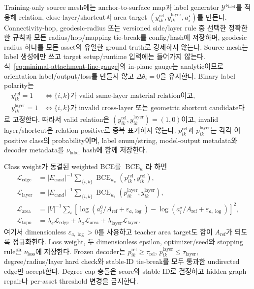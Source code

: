 \documentclass[11pt]{article}
\begin{document}
Training-only source mesh에는 anchor-to-surface map과 label generator
\(\mathcal Y^{\nu_{\mathrm{label}}}\)를 적용해 relation, close-layer/shortcut과 area target
\((y_{ik}^{\mathrm{rel}},y_{ik}^{\mathrm{layer}},a_i^\star)\)를 만든다. Connectivity-hop, geodesic-radius
또는 versioned side/layer rule 중 선택한 정확한 한 규칙과 모든 radius/hop/mapping tie-break를 config/hash에
저장하며, geodesic radius 하나를 모든 asset의 유일한 ground truth로 강제하지 않는다. Source mesh는
label 생성에만 쓰고 target setup/runtime 입력에는 들어가지 않는다. 식~\eqref{eq:minimal-attachment-line-gauge}의
in-plane gauge는 analytic이므로 orientation label/output/loss를 만들지 않고 \(\Delta\theta_i=0\)을 유지한다.
Binary label polarity는
\[
\begin{aligned}
  y_{ik}^{\mathrm{rel}}=1
  &\iff \{i,k\}\text{가 valid same-layer material relation이고},\\
  y_{ik}^{\mathrm{layer}}=1
  &\iff \{i,k\}\text{가 invalid cross-layer 또는 geometric shortcut candidate다}
\end{aligned}
\]
로 고정한다. 따라서 valid relation은 \((y_{ik}^{\mathrm{rel}},y_{ik}^{\mathrm{layer}})=(1,0)\)이고,
invalid layer/shortcut은 relation positive로 중복 표기하지 않는다.
\(p_{ik}^{\mathrm{rel}}\)과 \(p_{ik}^{\mathrm{layer}}\)는 각각 이 positive class의 probability이며,
label enum/string, model-output metadata와 decoder metadata를 \(\nu_{\mathrm{label}}\) hash에 함께 저장한다.

Class weight가 동결된 weighted BCE를 \(\operatorname{BCE}_{w}\)라 하면
\begin{equation}
\begin{aligned}
  \mathcal L_{\mathrm{edge}}
  &=|E_{\mathrm{cand}}|^{-1}\sum_{\{i,k\}}\operatorname{BCE}_{w_e}
    (p_{ik}^{\mathrm{rel}},y_{ik}^{\mathrm{rel}}),\\
  \mathcal L_{\mathrm{layer}}
  &=|E_{\mathrm{cand}}|^{-1}\sum_{\{i,k\}}\operatorname{BCE}_{w_l}
    (p_{ik}^{\mathrm{layer}},y_{ik}^{\mathrm{layer}}),\\
  \mathcal L_{\mathrm{area}}
  &=|V|^{-1}\sum_i\left[\log(a_i^0/A_{\mathrm{ref}}+\varepsilon_{a,\log})-
    \log(a_i^\star/A_{\mathrm{ref}}+\varepsilon_{a,\log})\right]^2,\\
  \mathcal L_{\mathrm{topo}}
  &=\lambda_e\mathcal L_{\mathrm{edge}}
    +\lambda_a\mathcal L_{\mathrm{area}}
    +\lambda_{\mathrm{layer}}\mathcal L_{\mathrm{layer}}.
\end{aligned}
  \label{eq:minimal-topology-loss}
\end{equation}
여기서 dimensionless \(\varepsilon_{a,\log}>0\)를 사용하고 teacher area target도
합이 \(A_{\mathrm{ref}}\)가 되도록 정규화한다.
Loss weight, 두 dimensionless epsilon, optimizer/seed와 stopping rule은 \(\nu_{\mathrm{loss}}\)에 저장한다.
Frozen decoder는 \(p_{ik}^{\mathrm{rel}}\geq\tau_{\mathrm{rel}}\),
\(p_{ik}^{\mathrm{layer}}\leq\tau_{\mathrm{layer}}\), degree/radius/layer hard check와 stable-ID tie-break를
모두 통과한 undirected edge만 accept한다. Degree cap 충돌은 score와 stable ID로 결정하고 hidden graph
repair나 per-asset threshold 변경을 금지한다.
\end{document}
